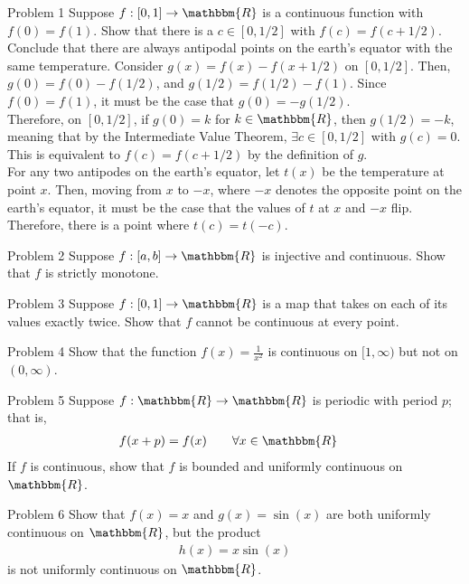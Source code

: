 \documentclass[8pt]{extarticle}
\title{}
\author{}
\date{}
\newcommand{\R}{\mathbbm{R}}
\begin{document}
  \begin{problem}{Problem 1}
    Suppose $f:[0,1]\rightarrow \R$ is a continuous function with $f(0) = f(1)$. Show that there is a $c\in [0,1/2]$ with $f(c) = f(c + 1/2)$. Conclude that there are always antipodal points on the earth's equator with the same temperature.
    \tcblower
    Consider $g(x) = f(x) - f(x+1/2)$ on $[0,1/2]$. Then, $g(0) = f(0) - f(1/2)$, and $g(1/2) = f(1/2) - f(1)$. Since $f(0) = f(1)$, it must be the case that $g(0) = -g(1/2)$.\\

    Therefore, on $[0,1/2]$, if $g(0) = k$ for $k\in\R$, then $g(1/2) = -k$, meaning that by the Intermediate Value Theorem, $\exists c\in [0,1/2]$ with $g(c)=  0$. This is equivalent to $f(c) = f(c+1/2)$ by the definition of $g$.\\

    For any two antipodes on the earth's equator, let $t(x)$ be the temperature at point $x$. Then, moving from $x$ to $-x$, where $-x$ denotes the opposite point on the earth's equator, it must be the case that the values of $t$ at $x$ and $-x$ flip. Therefore, there is a point where $t(c) = t(-c)$.
  \end{problem}
  \begin{problem}{Problem 2}
    Suppose $f: [a,b] \rightarrow \R$ is injective and continuous. Show that $f$ is strictly monotone.
  \end{problem}
  \begin{problem}{Problem 3}
    Suppose $f: [0,1]\rightarrow \R$ is a map that takes on each of its values exactly twice. Show that $f$ cannot be continuous at every point.
  \end{problem}
  \begin{problem}{Problem 4}
    Show that the function $f(x) = \frac{1}{x^2}$ is continuous on $[1,\infty)$ but not on $(0,\infty)$.
  \end{problem}
  \begin{problem}{Problem 5}
    Suppose $f: \R\rightarrow \R$ is periodic with period $p$; that is,
    \begin{align*}
      f(x+p) &= f(x)\tag*{$\forall x\in\R$}
    \end{align*}
    If $f$ is continuous, show that $f$ is bounded and uniformly continuous on $\R$.
  \end{problem}
  \begin{problem}{Problem 6}
    Show that $f(x) = x$ and $g(x) = \sin(x)$ are both uniformly continuous on $\R$, but the product
    \begin{align*}
      h(x) = x\sin(x)
    \end{align*}
    is not uniformly continuous on $\R$.
  \end{problem}
\end{document}
